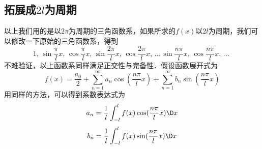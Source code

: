\subsection{拓展成$2l$为周期}
以上我们用的是以$2\pi $为周期的三角函数系，如果所求的$f( x )$以$2l$为周期，我们可以修改一下原始的三角函数系，得到
\begin{equation}
1,\,\sin \frac{\pi }{l}x,\,\cos \frac{\pi }{l}x,\,\sin \frac{{2\pi }}{l}x,\,\cos \frac{{2\pi }}{l}x,\,...\,\sin \frac{{n\pi }}{l}x,\,\cos \frac{{n\pi }}{l}x,\,...\,\,
\end{equation}
不难验证，以上函数系同样满足正交性与完备性．假设函数展开式为
\begin{equation}
f( x ) = \frac{{{a_0}}}{2} + \sum\limits_{n = 1}^\infty {{a_n}\cos (\frac{{n\pi }}{l}x) + } \sum\limits_{n = 1}^\infty {{b_n}\sin (\frac{{n\pi }}{l}x)}
\end{equation}
用同样的方法，可以得到系数表达式为
\begin{equation}
{a_n} = \frac{1}{l}\int_{ - l}^l {f( x )\cos (\frac{{n\pi }}{l}x)\D x}
\end{equation}
\begin{equation}
{b_n} = \frac{1}{l}\int_{ - l}^l {f( x )\sin (\frac{{n\pi }}{l}x)\D x}
\end{equation}